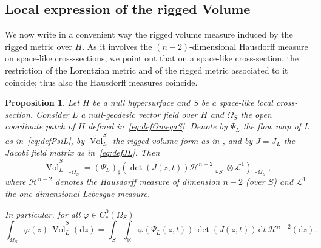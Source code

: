 \documentclass[12pt,a4paper]{amsart}
\theoremstyle{plain}
\newtheorem{proposition}[lemma]{Proposition}
\theoremstyle{definition}
\numberwithin{equation}{section}
\let\phi\varphi
\newcommand{\R}{\mathbb{R}}
\DeclareMathOperator{\vol}{Vol}
\newcommand{\de}{{\mathrm{d}}}
\newcommand{\haus}{\mathcal{H}}
\newcommand{\gflow}{\Psi}
\begin{document}

\subsection{Local expression of the rigged Volume} 
 
 We now  write in a convenient way the rigged volume measure induced by the rigged metric over $H$.
As it involves the $(n-2)$-dimensional Hausdorff measure on space-like cross-sections,
%
we point out that on a space-like cross-section, the restriction
of the Lorentzian metric and of the rigged metric associated to it coincide; thus also the Hausdorff measures coincide.



 
\begin{proposition}
  Let $H$ be a null hypersurface and $S$ be a space-like local
  cross-section.
  Consider $L$ a null-geodesic vector field over $H$ and $\Omega_{S}$ 
  the open coordinate patch of $H$ defined in~\eqref{eq:defOmegaS}. Denote by $\gflow_{L}$ the flow map of  $L$ as in~\eqref{eq;defPsiL}, by $\tilde{\vol}_{L}^{S}$ the rigged volume form as in , and by $J=J_L$ the Jacobi field matrix as in~\eqref{eq:defJL}.
Then 
$$
\tilde{\vol}_{L}^{S}\llcorner_{\Omega_{S}} = (\gflow_{L} )_{\sharp} (\det (J(z,t))  \haus^{n-2}\llcorner_{S} \otimes \mathcal{L}^{1} ) \llcorner_{\Omega_{S}},
$$
where  $ \haus^{n-2}$ denotes the Hausdorff measure of dimension $n-2$ (over $S$) and  $\mathcal{L}^{1}$ the one-dimensional Lebesgue measure. 

In particular, for all $\phi \in C^{0}_c(\Omega_S)$
\begin{equation}
    \label{eq:representation-rigged-volume}
    \int_{\Omega_S}
    \phi(z)
    \,
    \tilde{\vol}_L^S
    (\de z)
    =
    \int_S
    \int_{\R}
    \phi(\gflow_L(z,t))
    \,
\det (J(z,t))
    \,
    \de t
    \,
    \haus^{n-2}(\de z).
\end{equation}
\end{proposition}
\end{document}
